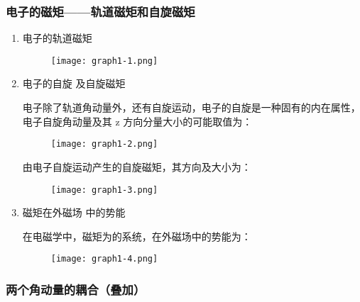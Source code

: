 \documentclass[dvipsnames, svgnames,a4paper,11pt]{article}
\begin{document}
        
    \subsubsection{电子的磁矩——轨道磁矩和自旋磁矩}

		\begin{enumerate}
			\item 电子的轨道磁矩

				\begin{figure}[htbp]
					\centering
					\texttt{[image: graph1-1.png]}
					\label{fig:graph1-1}
				\end{figure}

			\item 电子的自旋 及自旋磁矩
			
				电子除了轨道角动量外，还有自旋运动，电子的自旋是一种固有的内在属性，电子自旋角动量及其 z 方向分量大小的可能取值为：

					\begin{figure}[htbp]
						\centering
						\texttt{[image: graph1-2.png]}
						\label{fig:graph1-2}
					\end{figure}

				由电子自旋运动产生的自旋磁矩，其方向及大小为：

					\begin{figure}[htbp]
						\centering
						\texttt{[image: graph1-3.png]}
						\label{fig:graph1-3}
					\end{figure}

			\item 磁矩在外磁场 中的势能
					
				在电磁学中，磁矩为的系统，在外磁场中的势能为：

					\begin{figure}[H]
						\centering
						\texttt{[image: graph1-4.png]}
						\label{fig:graph1-4}
					\end{figure}

					
		\end{enumerate}


	\subsubsection{两个角动量的耦合（叠加）}
\end{document}
